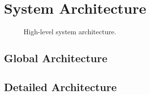 \section{System Architecture}

\lipsum[1]

\begin{figure}[H]
	\centering
	\caption{High-level system architecture.}
	\label{fig:architecture}
\end{figure}

\subsection{Global Architecture}

\lipsum[2]

\subsection{Detailed Architecture}

\lipsum[3]
